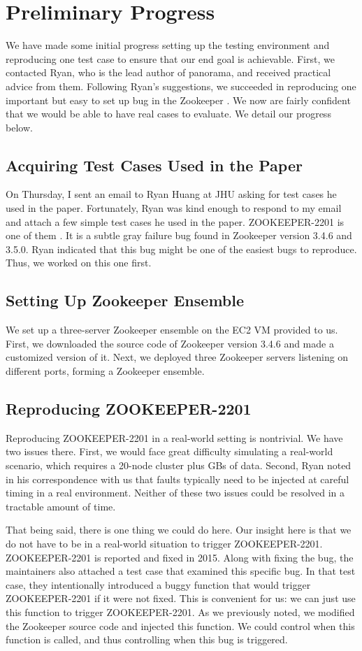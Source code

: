 \section{Preliminary Progress}
We have made some initial progress setting up the testing environment and reproducing one test case to ensure that our end goal is achievable. First, we contacted Ryan, who is the lead author of panorama, and received practical advice from them. Following Ryan's suggestions, we succeeded in reproducing one important but easy to set up bug in the Zookeeper \cite{httpsiss99:online}. We now are fairly confident that we would be able to have real cases to evaluate. We detail our progress below.
\subsection{Acquiring Test Cases Used in the Paper}
On Thursday, I sent an email to Ryan Huang at JHU asking for test cases he used in the paper. Fortunately, Ryan was kind enough to respond to my email and attach a few simple test cases he used in the paper. ZOOKEEPER-2201 is one of them \cite{httpsiss99:online}. It is a subtle gray failure bug found in Zookeeper version 3.4.6 and 3.5.0. Ryan indicated that this bug might be one of the easiest bugs to reproduce. Thus, we worked on this one first.
\subsection{Setting Up Zookeeper Ensemble}
We set up a three-server Zookeeper ensemble on the EC2 VM provided to us. First, we downloaded the source code of Zookeeper version 3.4.6 and made a customized version of it. Next, we deployed three Zookeeper servers listening on different ports, forming a Zookeeper ensemble.
\subsection{Reproducing ZOOKEEPER-2201}
\label{subsec:rbug}
Reproducing ZOOKEEPER-2201 in a real-world setting is nontrivial. We have two issues there. First, we would face great difficulty simulating a real-world scenario, which requires a 20-node cluster plus GBs of data. Second, Ryan noted in his correspondence with us that faults typically need to be injected at careful timing in a real environment. Neither of these two issues could be resolved in a tractable amount of time. 

That being said, there is one thing we could do here. Our insight here is that we do not have to be in a real-world situation to trigger ZOOKEEPER-2201. ZOOKEEPER-2201 is reported and fixed in 2015. Along with fixing the bug, the maintainers also attached a test case that examined this specific bug. In that test case, they intentionally introduced a buggy function that would trigger ZOOKEEPER-2201 if it were not fixed. This is convenient for us: we can just use this function to trigger ZOOKEEPER-2201. As we previously noted, we modified the Zookeeper source code and injected this function. We could control when this function is called, and thus controlling when this bug is triggered. 

